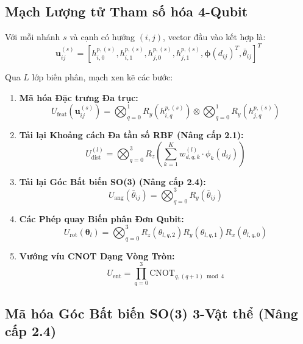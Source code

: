 \documentclass[10pt,twocolumn,letterpaper]{article}
\begin{document}
\subsection{Mạch Lượng tử Tham số hóa 4-Qubit}

Với mỗi nhánh $s$ và cạnh có hướng $(i, j)$, vector đầu vào kết hợp là:
\begin{equation}
    \mathbf{u}_{ij}^{(s)} = \left[h_{i,0}^{p,(s)}, h_{i,1}^{p,(s)}, h_{j,0}^{p,(s)}, h_{j,1}^{p,(s)}, \boldsymbol{\phi}(d_{ij})^T, \bar{\theta}_{ij}\right]^T
\end{equation}

Qua $L$ lớp biến phân, mạch xen kẽ các bước:
\begin{enumerate}
    \item \textbf{Mã hóa Đặc trưng Đa trục:}
    \begin{equation}
        U_{\mathrm{feat}}(\mathbf{u}_{ij}^{(s)}) = \bigotimes_{q=0}^1 R_y(h_{i,q}^{p,(s)}) \otimes \bigotimes_{q=0}^1 R_y(h_{j,q}^{p,(s)})
    \end{equation}
    \item \textbf{Tải lại Khoảng cách Đa tần số RBF (Nâng cấp 2.1):}
    \begin{equation}
        U_{\mathrm{dist}}^{(l)} = \bigotimes_{q=0}^3 R_z\!\left(\sum_{k=1}^K w_{d,q,k}^{(l)} \cdot \phi_k(d_{ij})\right)
    \end{equation}
    \item \textbf{Tải lại Góc Bất biến SO(3) (Nâng cấp 2.4):}
    \begin{equation}
        U_{\mathrm{ang}}(\bar{\theta}_{ij}) = \bigotimes_{q=0}^3 R_y(\bar{\theta}_{ij})
    \end{equation}
    \item \textbf{Các Phép quay Biến phân Đơn Qubit:}
    \begin{equation}
        U_{\mathrm{rot}}(\boldsymbol{\theta}_l) = \bigotimes_{q=0}^3 R_z(\theta_{l,q,2}) R_y(\theta_{l,q,1}) R_x(\theta_{l,q,0})
    \end{equation}
    \item \textbf{Vướng víu CNOT Dạng Vòng Tròn:}
    \begin{equation}
        U_{\mathrm{ent}} = \prod_{q=0}^3 \mathrm{CNOT}_{q, (q+1)\bmod 4}
    \end{equation}
\end{enumerate}

\subsection{Mã hóa Góc Bất biến SO(3) 3-Vật thể (Nâng cấp 2.4)}
\end{document}
